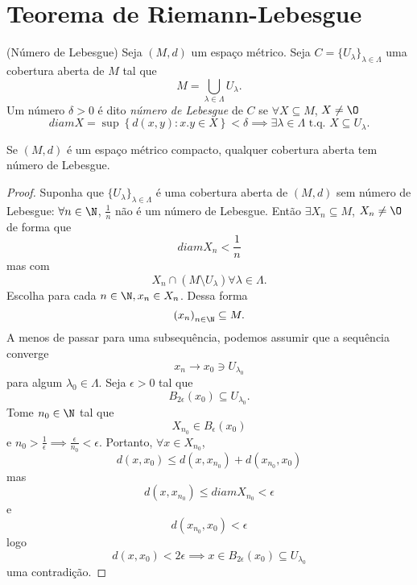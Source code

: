 
\section*{Teorema de Riemann-Lebesgue}

\begin{definition}
    (Número de Lebesgue) Seja $\left( M,d \right) $ um espaço métrico. Seja $C=\{U_\lambda\} _{\lambda \in \Lambda}$ uma cobertura aberta de $M$ tal que \[
    M = \bigcup_{\lambda \in  \Lambda} U_\lambda
    .\] Um número $\delta >0$ é dito \emph{número de Lebesgue} de $C$ se $\forall X\subseteq M$, $X\neq \O$ \[
    diam X = \sup \left\{ d\left( x,y \right) : x.y\in X \right\} < \delta \implies \exists \lambda \in \Lambda \text{ t.q. } X\subseteq U_\lambda
    .\] 
\end{definition}
\begin{lemma}
    Se $\left( M,d \right) $ é um espaço métrico compacto, qualquer cobertura aberta tem número de Lebesgue.
\end{lemma}
\begin{proof}
    Suponha que $\{U_\lambda\} _{\lambda\in \Lambda}$ é uma cobertura aberta de $\left( M,d \right) $ sem número de Lebesgue: $\forall n\in \N$, $\frac{1}{n}$ não é um número de Lebesgue. Então $\exists X_n\subseteq M$, $X_n \neq \O$ de forma que \[
    diam X_n < \frac{1}{n}
    \] mas com \[
    X_n \cap \left( M\setminus U_\lambda \right) \forall \lambda \in \Lambda
    .\] Escolha para cada $n\in \N, x_{n}\in X_n$. Dessa forma \[
    \left( x_n \right) _{n\in \N}\subseteq M
    .\] A menos de passar para uma subsequência, podemos assumir que a sequência converge \[
    x_n \to x_0 \ni U_{\lambda_0}
    \] para algum $\lambda_0 \in \Lambda$.
    Seja $\epsilon>0$ tal que \[
    B_{2\epsilon}\left( x_0 \right) \subseteq U_{\lambda_0}
    .\] Tome $n_0\in \N$ tal que \[
    X_{n_0}\in B_{\epsilon}\left( x_0 \right) 
    \] e $ n_0 > \frac{1}{\epsilon} \implies \frac{\epsilon}{n_0} < \epsilon$. Portanto, $\forall x\in X_{n_0}$, \[
    d\left( x,x_0 \right) \le d\left( x, x_{n_0} \right) + d\left( x_{n_0}, x_0 \right) 
    \] mas \[
    d\left( x, x_{n_0} \right) \le diam X_{n_0} < \epsilon
    \] e \[
    d\left( x_{n_0}, x_0 \right) < \epsilon
    \] logo \[
    d\left( x,x_0 \right) < 2\epsilon \implies x\in B_{2\epsilon}\left( x_0 \right) \subseteq U_{\lambda_0}
    \] uma contradição.
\end{proof}

